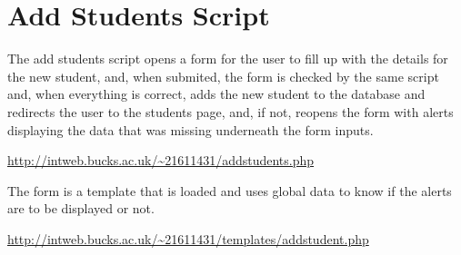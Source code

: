 \chapter{Add Students Script}
The add students script opens a form for the user to fill up with the details for the new student, and, when submited, the form is checked by the same script and, when everything is correct, adds the new student to the database and redirects the user to the students page, and, if not, reopens the form with alerts displaying the data that was missing underneath the form inputs.

\url{http://intweb.bucks.ac.uk/~21611431/addstudents.php}
\captionsetup{type=figure}


The form is a template that is loaded and uses global data to know if the alerts are to be displayed or not.

\url{http://intweb.bucks.ac.uk/~21611431/templates/addstudent.php}
\captionsetup{type=figure}

